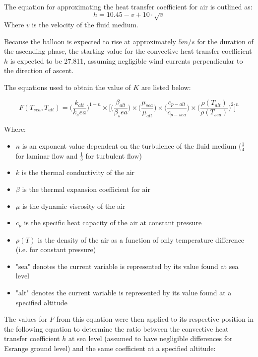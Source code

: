 The equation for approximating the heat transfer coefficient for air is outlined as:
\begin{equation*}
h = 10.45 - v + 10\cdot\sqrt{v}
\end{equation*}
Where $v$ is the velocity of the fluid medium.

Because the balloon is expected to rise at approximately $5 m/s$ for the duration of the ascending phase, the starting value for the convective heat transfer coefficient $h$ is expected to be 27.811, assuming negligible wind currents perpendicular to the direction of ascent. %

The equations used to obtain the value of $K$ are listed below:

\begin{equation*}
F(T_{sea}, T_{alt}) = \big(\frac{k_{alt}}{k_sea}\big)^{1-n}\times \Big[\Big(\frac{\beta_{alt}}{\beta_sea}\Big)\times \Big(\frac{\mu_{sea}}{\mu_{alt}}\Big)\times \Big(\frac{c_{p-alt}}{c_{p-sea}}\Big)\times \Big(\frac{\rho(T_{alt})}{\rho(T_{sea})}\Big)^{2}\Big]^{n}
\end{equation*}

Where:
\begin{itemize}
    \item $n$ is an exponent value dependent on the turbulence of the fluid medium ($\frac{1}{4}$ for laminar flow and $\frac{1}{3}$ for turbulent flow)
    \item $k$ is the thermal conductivity of the air
    \item $\beta$ is the thermal expansion coefficient for air
    \item $\mu$ is the dynamic viscosity of the air
    \item $c_{p}$ is the specific heat capacity of the air at constant pressure
    \item $\rho(T)$ is the density of the air as a function of only temperature difference (i.e. for constant pressure)
    \item "sea" denotes the current variable is represented by its value found at sea level
    \item "alt" denotes the current variable is represented by its value found at a specified altitude
\end{itemize}


The values for $F$ from this equation were then applied to its respective position in the following equation to determine the ratio between the convective heat transfer coefficient $h$ at sea level (assumed to have negligible differences for Esrange ground level) and the same coefficient at a specified altitude:


